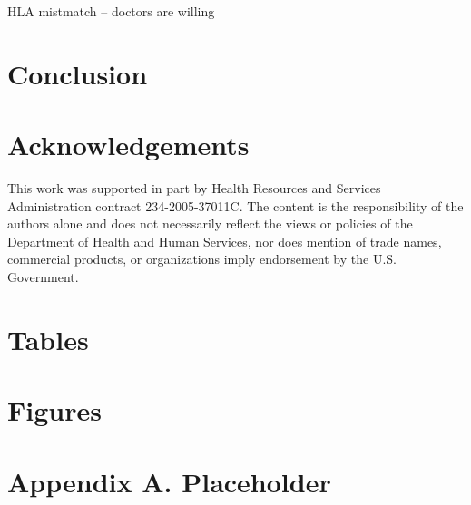 \documentclass[12pt]{article}
\begin{document}
HLA mistmatch -- doctors are willing 

\section{Conclusion} \label{sec:conclusion}


\section{Acknowledgements}

This work was supported in part by Health Resources and Services Administration contract 234-2005-37011C. The content is the responsibility of the authors alone and does not necessarily reflect the views or policies of the Department of Health and Human Services, nor does mention of trade names, commercial products, or organizations imply endorsement by the U.S. Government.

\clearpage





\clearpage

\onehalfspacing

\section*{Tables} \label{sec:tab}



\clearpage

\section*{Figures} \label{sec:fig}




\clearpage

\section*{Appendix A. Placeholder} \label{sec:appendixa}
\end{document}
